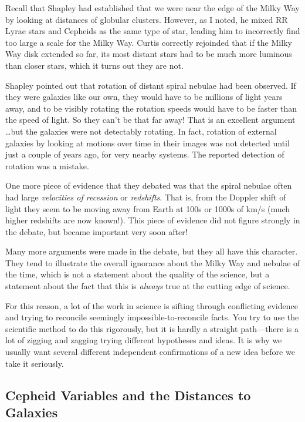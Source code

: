 \documentclass[12pt, preprint]{aastex}
\begin{document}
Recall that Shapley had established that we were near the edge of the
Milky Way by looking at distances of globular clusters. However, as I
noted, he mixed RR Lyrae stars and Cepheids as the same type of star,
leading him to incorrectly find too large a scale for the Milky
Way. Curtis correctly rejoinded that if the Milky Way disk extended so
far, its most distant stars had to be much more luminous than closer
stars, which it turns out they are not. 

Shapley pointed out that rotation of distant spiral nebulae had been
observed. If they were galaxies like our own, they would have to be
millions of light years away, and to be visibly rotating the rotation
speeds would have to be faster than the speed of light. So they can't
be that far away! That is an excellent argument \ldots but the
galaxies were not detectably rotating. In fact, rotation of external
galaxies by looking at motions over time in their images was not
detected until just a couple of years ago, for very nearby
systems. The reported detection of rotation was a mistake.

One more piece of evidence that they debated was that the spiral
nebulae often had large {\it velocities of recession} or {\it
  redshifts}. That is, from the Doppler shift of light they seem to be
moving away from Earth at 100s or 1000s of km/s (much higher redshifts
are now known!). This piece of evidence did not figure strongly in the
debate, but became important very soon after! 

Many more arguments were made in the debate, but they all have this
character. They tend to illustrate the overall ignorance about the
Milky Way and nebulae of the time, which is not a statement about the
quality of the science, but a statement about the fact that this is
{\it always} true at the cutting edge of science.

For this reason, a lot of the work in science is sifting through
conflicting evidence and trying to reconcile seemingly
impossible-to-reconcile facts. You try to use the scientific method to
do this rigorously, but it is hardly a straight path---there is a lot
of zigging and zagging trying different hypotheses and ideas. It is
why we usually want several different independent confirmations of a
new idea before we take it seriously.

\subsection{Cepheid Variables and the Distances to Galaxies}
\end{document}
